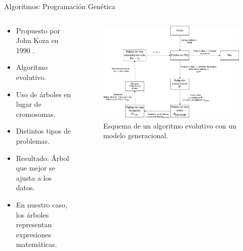 \documentclass{beamer}
\begin{document}
\begin{frame}{Algoritmos: Programación Genética}

	\begin{columns}[T]

		\begin{column}{.4\textwidth}
			\begin{itemize}
				\item Propuesto por John Koza en 1990 \cite{kozaGP}.
				\item Algoritmo evolutivo.
				\item Uso de árboles en lugar de cromosomas.
				\item Distintos tipos de problemas.
				\item Resultado: Árbol que mejor se ajusta a los datos.
				\item En nuestro caso, los árboles representan expresiones matemáticas.
			\end{itemize}
		\end{column}


		\begin{column}{.6\textwidth}
			\begin{figure}[H]
			    \centering
				 \includegraphics[width=\textwidth]{generacional.png}
			    \caption{Esquema de un algoritmo evolutivo con un modelo generacional.}
				 \label{fig:modelo_generacioal}
			\end{figure}
		\end{column}

	\end{columns}

\end{frame}
\end{document}
